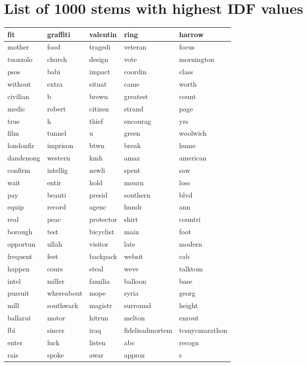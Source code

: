 \chapter{List of 1000 stems with highest IDF values}\label{ch:1000_stems}

\begin{longtable}{p{2.5cm}p{2.5cm}p{2.5cm}p{2.5cm}p{2.5cm}}
fit&graffiti&valentin&ring&harrow\\ \hline 
mother&food&tragedi&veteran&focus\\ \hline 
tuozzolo&church&design&vote&mornington\\ \hline 
psos&babi&impact&coordin&class\\ \hline 
without&extra&situat&came&worth\\ \hline 
civilian&b&brown&greatest&count\\ \hline 
medic&robert&citizen&strand&page\\ \hline 
true&h&thief&encourag&yrs\\ \hline 
film&tunnel&u&green&woolwich\\ \hline 
londonfir&imprison&btwn&break&hume\\ \hline 
dandenong&western&kmh&amaz&american\\ \hline 
confirm&intellig&newli&spent&saw\\ \hline 
wait&entir&hold&mourn&loss\\ \hline 
pay&beauti&presid&southern&blvd\\ \hline 
equip&record&agenc&hundr&ann\\ \hline 
real&peac&protector&shirt&countri\\ \hline 
borough&test&bicyclist&main&foot\\ \hline 
opportun&ullah&visitor&late&modern\\ \hline 
frequent&feet&backpack&websit&cab\\ \hline 
happen&cours&steal&weve&talktom\\ \hline 
intel&miller&familia&balloon&base\\ \hline 
pursuit&whereabout&mope&syria&georg\\ \hline 
mill&southwark&magistr&surround&height\\ \hline 
ballarat&motor&hitrun&melton&enrout\\ \hline 
fbi&sincer&iraq&fidelisadmortem&tcsnycmarathon\\ \hline 
enter&luck&listen&abc&recogn\\ \hline 
rais&spoke&awar&approx&r\\ \hline 

\end{longtable}
